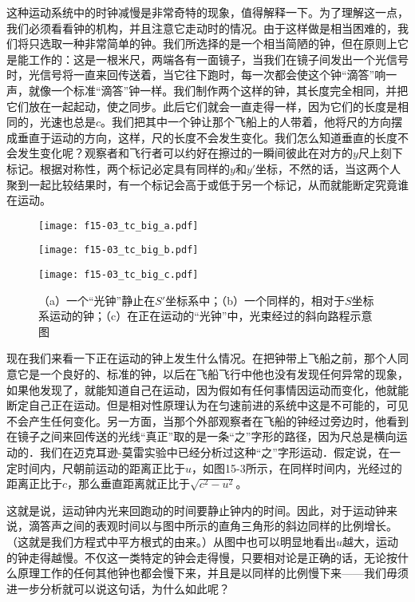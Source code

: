 \documentclass[12pt,oneside]{book}
\begin{document}
这种运动系统中的时钟减慢是非常奇特的现象，值得解释一下。为了理解这一点，我们必须看看钟的机构，并且注意它走动时的情况。由于这样做是相当困难的，我们将只选取一种非常简单的钟。我们所选择的是一个相当简陋的钟，但在原则上它是能工作的：这是一根米尺，两端各有一面镜子，当我们在镜子间发出一个光信号时，光信号将一直来回传送着，当它往下跑时，每一次都会使这个钟“滴答”响一声，就像一个标准“滴答”钟一样。我们制作两个这样的钟，其长度完全相同，并把它们放在一起起动，使之同步。此后它们就会一直走得一样，因为它们的长度是相同的，光速也总是$ c $。我们把其中一个钟让那个飞船上的人带着，他将尺的方向摆成垂直于运动的方向，这样，尺的长度不会发生变化。我们怎么知道垂直的长度不会发生变化呢？观察者和飞行者可以约好在擦过的一瞬间彼此在对方的$ y $尺上刻下标记。根据对称性，两个标记必定具有同样的$ y $和$ y' $坐标，不然的话，当这两个人聚到一起比较结果时，有一个标记会高于或低于另一个标记，从而就能断定究竟谁在运动。



\begin{figure}[H]
\centering
\texttt{[image: f15-03\_tc\_big\_a.pdf]}

\texttt{[image: f15-03\_tc\_big\_b.pdf]}

\texttt{[image: f15-03\_tc\_big\_c.pdf]}


\caption{（a）一个“光钟”静止在$ S' $坐标系中；（b）一个同样的，相对于$ S $坐标系运动的钟；（c）在正在运动的“光钟”中，光束经过的斜向路程示意图}
\label{fig:15-3}

\end{figure}




现在我们来看一下正在运动的钟上发生什么情况。在把钟带上飞船之前，那个人同意它是一个良好的、标准的钟，以后在飞船飞行中他也没有发现任何异常的现象，如果他发现了，就能知道自己在运动，因为假如有任何事情因运动而变化，他就能断定自己正在运动。但是相对性原理认为在匀速前进的系统中这是不可能的，可见不会产生任何变化。另一方面，当那个外部观察者在飞船的钟经过旁边时，他看到在镜子之间来回传送的光线“真正”取的是一条“之”字形的路径，因为尺总是横向运动的．我们在迈克耳逊-莫雷实验中已经分析过这种“之”字形运动．假定说，在一定时间内，尺朝前运动的距离正比于$ u $，如图15-3所示，在同样时间内，光经过的距离正比于$ c $，那么垂直距离就正比于$ \sqrt{c^2 - u^2} $。


这就是说，运动钟内光来回跑动的时间要静止钟内的时间。因此，对于运动钟来说，滴答声之间的表观时间以与图中所示的直角三角形的斜边同样的比例增长。（这就是我们方程式中平方根式的由来。）从图中也可以明显地看出$ u $越大，运动的钟走得越慢。不仅这一类特定的钟会走得慢，只要相对论是正确的话，无论按什么原理工作的任何其他钟也都会慢下来，并且是以同样的比例慢下来——我们毋须进一步分析就可以说这句话，为什么如此呢？
\end{document}
